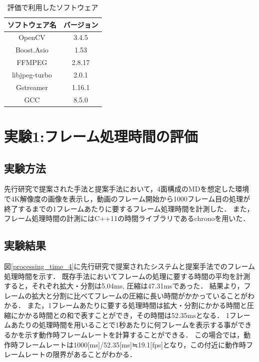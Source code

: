 \begin{table}[H]
    \caption{評価で利用したソフトウェア}
    \begin{center}
    \begin{tabular}{cc}
    \hline
    ソフトウェア名 & バージョン \\\hline\hline
    OpenCV & 3.4.5 \\ \hline
    Boost.Asio  & 1.53  \\ \hline
    FFMPEG & 2.8.17 \\ \hline
    libjpeg-turbo & 2.0.1 \\ \hline
    Gstreamer & 1.16.1 \\ \hline
    GCC & 8.5.0 \\ \hline
    \end{tabular}
    \label{software_version}
    \end{center}
\end{table}


\section{実験1:フレーム処理時間の評価}

\subsection*{実験方法}
先行研究で提案された手法と提案手法において，4面構成のMDを想定した環境で4K解像度の画像を表示し，動画のフレーム開始から1000フレーム目の処理が終了するまでの1フレームあたりに要するフレーム処理時間を計測した．
また，フレーム処理時間の計測にはC++11の時間ライブラリであるchronoを用いた．

\subsection*{実験結果}
図\ref{processing_time_4}に先行研究で提案されたシステムと提案手法でのフレーム処理時間を示す．
既存手法においてフレームの処理に要する時間の平均を計測すると，それぞれ拡大・分割は5.04ms, 圧縮は47.31msであった．
結果より，フレームの拡大と分割に比べてフレームの圧縮に長い時間がかかっていることがわかる．
また，1フレームあたりに要する処理時間は拡大・分割にかかる時間と圧縮にかかる時間との和で表すことができ，その時間は52.35msとなる．
1フレームあたりの処理時間を用いることで1秒あたりに何フレームを表示する事ができるかを示す動作時フレームレートを計算することができる．
この場合では，動作時フレームレートは1000[ms]/52.35[ms]≒19.1[fps]となり，この付近に動作時フレームレートの限界があることがわかる．

